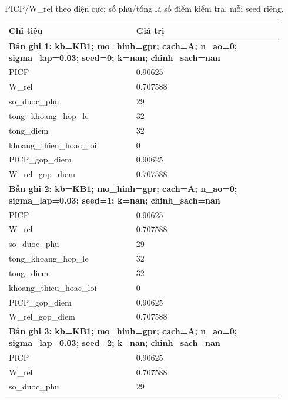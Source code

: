 \par\smallskip\noindent PICP/W\_rel theo điện cực; số phủ/tổng là số điểm kiểm tra, mỗi seed riêng.\par
\begin{longtable}{p{0.43\linewidth}p{0.50\linewidth}}
\toprule Chỉ tiêu & Giá trị \\ \midrule \endhead
\multicolumn{2}{p{0.95\linewidth}}{\textbf{Bản ghi 1: kb=KB1; mo\_hinh=gpr; cach=A; n\_ao=0; sigma\_lap=0.03; seed=0; k=nan; chinh\_sach=nan}} \\
PICP & 0.90625 \\
W\_\allowbreak rel & 0.707588 \\
so\_\allowbreak duoc\_\allowbreak phu & 29 \\
tong\_\allowbreak khoang\_\allowbreak hop\_\allowbreak le & 32 \\
tong\_\allowbreak diem & 32 \\
khoang\_\allowbreak thieu\_\allowbreak hoac\_\allowbreak loi & 0 \\
PICP\_\allowbreak gop\_\allowbreak diem & 0.90625 \\
W\_\allowbreak rel\_\allowbreak gop\_\allowbreak diem & 0.707588 \\
\midrule
\multicolumn{2}{p{0.95\linewidth}}{\textbf{Bản ghi 2: kb=KB1; mo\_hinh=gpr; cach=A; n\_ao=0; sigma\_lap=0.03; seed=1; k=nan; chinh\_sach=nan}} \\
PICP & 0.90625 \\
W\_\allowbreak rel & 0.707588 \\
so\_\allowbreak duoc\_\allowbreak phu & 29 \\
tong\_\allowbreak khoang\_\allowbreak hop\_\allowbreak le & 32 \\
tong\_\allowbreak diem & 32 \\
khoang\_\allowbreak thieu\_\allowbreak hoac\_\allowbreak loi & 0 \\
PICP\_\allowbreak gop\_\allowbreak diem & 0.90625 \\
W\_\allowbreak rel\_\allowbreak gop\_\allowbreak diem & 0.707588 \\
\midrule
\multicolumn{2}{p{0.95\linewidth}}{\textbf{Bản ghi 3: kb=KB1; mo\_hinh=gpr; cach=A; n\_ao=0; sigma\_lap=0.03; seed=2; k=nan; chinh\_sach=nan}} \\
PICP & 0.90625 \\
W\_\allowbreak rel & 0.707588 \\
so\_\allowbreak duoc\_\allowbreak phu & 29 \\

\end{longtable}
